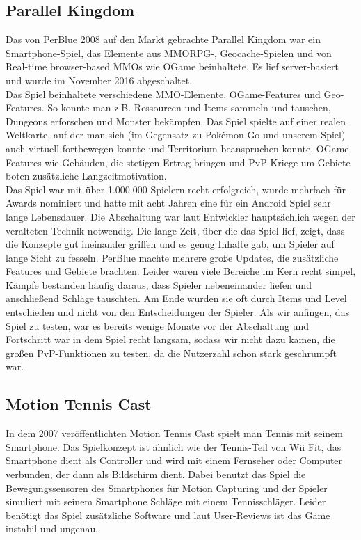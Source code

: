 \documentclass[extern,palatino]{cgBA}
\begin{document}
\subsection{Parallel Kingdom}
Das von PerBlue 2008 auf den Markt gebrachte Parallel Kingdom war ein Smartphone-Spiel, das Elemente aus MMORPG-, Geocache-Spielen und von Real-time browser-based MMOs wie OGame beinhaltete. Es lief server-basiert und wurde im November 2016 abgeschaltet. 
\\Das Spiel beinhaltete verschiedene MMO-Elemente, OGame-Features und Geo-Features. So konnte man z.B. Ressourcen und Items sammeln und tauschen, Dungeons erforschen und Monster bekämpfen. Das Spiel spielte  auf einer realen Weltkarte, auf der man sich (im Gegensatz zu Pokémon Go und unserem Spiel) auch virtuell fortbewegen konnte und Territorium beanspruchen konnte. OGame Features wie Gebäuden, die stetigen Ertrag bringen und PvP-Kriege um Gebiete boten zusätzliche Langzeitmotivation.
\\Das Spiel war mit über 1.000.000 Spielern recht erfolgreich, wurde mehrfach für Awards nominiert und hatte mit acht Jahren eine für ein Android Spiel sehr lange Lebensdauer.  %
Die Abschaltung war laut Entwickler hauptsächlich wegen der veralteten Technik notwendig. %
Die lange Zeit, über die das Spiel lief, zeigt, dass die Konzepte gut ineinander griffen und es genug Inhalte gab, um Spieler auf lange Sicht zu fesseln. PerBlue machte mehrere große Updates, die zusätzliche Features und Gebiete brachten. Leider waren viele Bereiche im Kern recht simpel, Kämpfe bestanden häufig daraus, dass Spieler nebeneinander liefen und anschließend Schläge tauschten. Am Ende wurden sie oft durch Items und Level entschieden und nicht von den Entscheidungen der Spieler. Als wir anfingen, das Spiel zu testen, war es bereits wenige Monate vor der Abschaltung und Fortschritt war in dem Spiel recht langsam, sodass wir nicht dazu kamen, die großen PvP-Funktionen zu testen, da die Nutzerzahl schon stark geschrumpft war.
\subsection{Motion Tennis Cast}
In dem 2007 veröffentlichten Motion Tennis Cast spielt man Tennis mit seinem Smartphone. Das Spielkonzept ist ähnlich wie der Tennis-Teil von Wii Fit, das Smartphone dient als Controller und wird mit einem Fernseher oder Computer verbunden, der dann als Bildschirm dient. Dabei benutzt das Spiel die Bewegungssensoren des Smartphones für Motion Capturing und der Spieler simuliert mit seinem Smartphone Schläge mit einem Tennisschläger. Leider benötigt das Spiel zusätzliche Software und laut User-Reviews ist das Game instabil und ungenau.
\newpage
\end{document}
